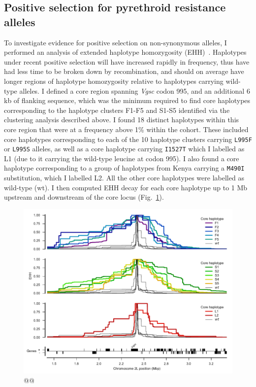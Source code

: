 \documentclass[a4paper,11pt,abstracton,hidelinks]{scrartcl}
\begin{document}
\subsection{Positive selection for pyrethroid resistance alleles}\label{subsec:results-selection}


To investigate evidence for positive selection on non-synonymous alleles, I performed an analysis of extended haplotype homozygosity (EHH)~\parencite{Sabeti2002}.
%
Haplotypes under recent positive selection will have increased rapidly in frequency, thus have had less time to be broken down by recombination, and should on average have longer regions of haplotype homozygosity relative to haplotypes carrying wild-type alleles.
%
I defined a core region spanning \textit{Vgsc} codon 995, and an additional 6 kb of flanking sequence, which was the minimum required to find core haplotypes corresponding to the haplotype clusters F1-F5 and S1-S5 identified via the clustering analysis described above.
%
I found 18 distinct haplotypes within this core region that were at a frequency above 1\% within the cohort.
%
These included core haplotypes corresponding to each of the 10 haplotype clusters carrying \texttt{L995F} or \texttt{L995S} alleles, as well as a core haplotype carrying \texttt{I1527T} which I labelled as L1 (due to it carrying the wild-type leucine at codon 995).
%
I also found a core haplotype corresponding to a group of haplotypes from Kenya carrying a \texttt{M490I} substitution, which I labelled L2.
%
All the other core haplotypes were labelled as wild-type (wt).
%
I then computed EHH decay for each core haplotype up to 1 Mb upstream and downstream of the core locus (Fig.~\ref{fig:ehh}).


\begin{figure}[t!]
\centering
\includegraphics[width=1\linewidth,center]{artwork/chapter6/ehh.pdf}
\caption{@@
}
\label{fig:ehh}
\end{figure}
\end{document}
